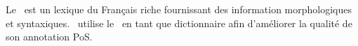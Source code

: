 \documentclass[manual-fr.tex]{subfiles}
\begin{document}
Le \LeFFFFullCite\ est un lexique du Français riche fournissant des information morphologiques et syntaxiques. \SEM\ utilise le \LeFFF\ en tant que dictionnaire afin d'améliorer la qualité de son annotation PoS.
\end{document}

